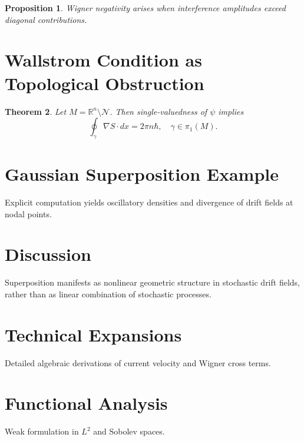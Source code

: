 \documentclass[11pt]{article}
\newtheorem{theorem}{Theorem}[section]
\newtheorem{proposition}[theorem]{Proposition}
\begin{document}
\begin{proposition}
Wigner negativity arises when interference amplitudes exceed diagonal contributions.
\end{proposition}

\section{Wallstrom Condition as Topological Obstruction}

\begin{theorem}
Let $M = \mathbb{R}^n \setminus \mathcal{N}$. Then single-valuedness of $\psi$ implies
\begin{equation}
\oint_\gamma \nabla S \cdot dx = 2\pi n \hbar, \quad \gamma \in \pi_1(M).
\end{equation}
\end{theorem}

\section{Gaussian Superposition Example}
Explicit computation yields oscillatory densities and divergence of drift fields at nodal points.

\section{Discussion}
Superposition manifests as nonlinear geometric structure in stochastic drift fields, rather than as linear combination of stochastic processes.

\appendix

\section{Technical Expansions}
Detailed algebraic derivations of current velocity and Wigner cross terms.

\section{Functional Analysis}
Weak formulation in $L^2$ and Sobolev spaces.
\end{document}
